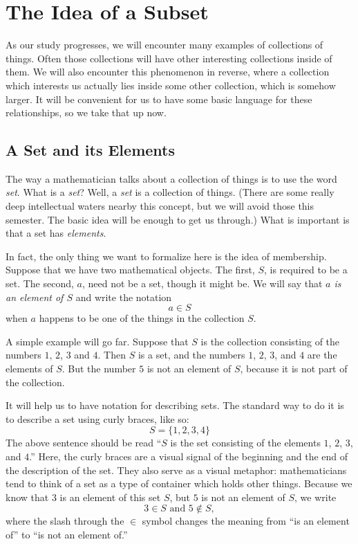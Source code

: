 \documentclass[elementsmain.tex]{subfiles}
\begin{document}
\section{The Idea of a Subset}



As our study progresses, we will encounter many examples of collections of things. Often those collections will have other interesting collections inside of them. We will also encounter this phenomenon in reverse, where a collection which interests us actually lies inside some other collection, which is somehow larger.  It will be convenient for us to have some basic language for these relationships, so we take that up now.

\subsection*{A Set and its Elements}

The way a mathematician talks about a collection of things is to use the word \emph{set}.
What is a \emph{set}? Well, a \emph{set} is a collection of things. (There are some really deep intellectual waters nearby this concept, but we will avoid those this semester. The basic idea will be enough to get us through.) What is important is that a set has \emph{elements}. 

In fact, the only thing we want to formalize here is the idea of membership. Suppose that we have two mathematical objects. The first, $S$, is required to be a set. The second, $a$, need not be a set, though it might be. We will say that \emph{$a$ is an element of $S$} and write the notation
\[
a \in S
\]
when $a$ happens to be one of the things in the collection $S$.

A simple example will go far. Suppose that $S$ is the collection consisting of the numbers $1$, $2$, $3$ and $4$. Then $S$ is a set, and the numbers $1$, $2$, $3$, and $4$ are the elements of $S$. But the number $5$ is not an element of $S$, because it is not part of the collection.

It will help us to have notation for describing sets. The standard way to do it is to describe a set using curly braces, like so:
\[
S = \{1, 2, 3, 4\}
\]
The above sentence should be read ``$S$ is the set consisting of the elements $1$, $2$, $3$, and $4$.'' Here, the curly braces are a visual signal of the beginning and the end of the description of the set. They also serve as a visual metaphor: mathematicians tend to think of a set as a type of container which holds other things. Because we know that $3$ is an element of this set $S$, but $5$ is not an element of $S$, we write
\[
3 \in S \text{ and } 5 \not\in S,
\]
where the slash through the $\in$ symbol changes the meaning from ``is an element of'' to ``is not an element of.''
\end{document}

